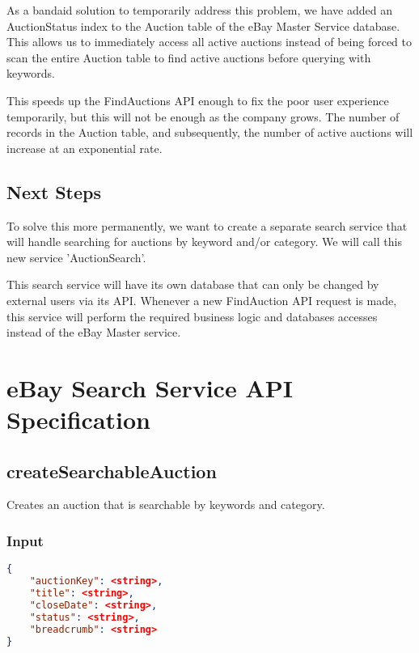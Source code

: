 \documentclass[12pt,a4paper]{article}
\begin{document}
As a bandaid solution to temporarily address this problem, we have added an 
AuctionStatus index to the Auction table of the eBay Master Service database.
This allows us to immediately access all active auctions instead of being forced 
to scan the entire Auction table to find active auctions before querying with keywords. 

\vspace{\baselineskip}
This speeds up the FindAuctions API enough to fix the poor user experience
temporarily, but this will not be enough as the company grows. The number of
records in the Auction table, and subsequently, the number of active auctions
will increase at an exponential rate.

\subsection{Next Steps}
To solve this more permanently, we want to create a separate search service
that will handle searching for auctions by keyword and/or category. 
We will call this new service 'AuctionSearch'. 

\vspace{\baselineskip}
This search service will have its own database that can only be changed
by external users via its API. Whenever a new FindAuction API request is made, 
this service will perform the required business logic and databases accesses 
instead of the eBay Master service.

\pagebreak

 
\section{eBay Search Service API Specification}

\subsection{createSearchableAuction}
\label{ref:csa}
Creates an auction that is searchable by keywords and category. 


\subsubsection{Input}
\begin{lstlisting}[language=json,firstnumber=1]
{
    "auctionKey": <string>,
    "title": <string>,
    "closeDate": <string>,
    "status": <string>,
    "breadcrumb": <string>
}
\end{lstlisting}
\end{document}
